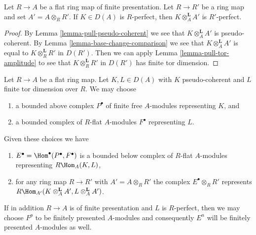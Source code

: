 \begin{lemma}
\label{lemma-base-change-relatively-perfect}
Let $R \to A$ be a flat ring map of finite presentation.
Let $R \to R'$ be a ring map and set $A' = A \otimes_R R'$.
If $K \in D(A)$ is $R$-perfect, then $K \otimes_A^\mathbf{L} A'$ is
$R'$-perfect.
\end{lemma}

\begin{proof}
By Lemma \ref{lemma-pull-pseudo-coherent} we see that
$K \otimes_A^\mathbf{L} A'$ is pseudo-coherent.
By Lemma \ref{lemma-base-change-comparison} we see that
$K \otimes_A^\mathbf{L} A'$ is equal to $K \otimes_R^\mathbf{L} R'$ in $D(R')$.
Then we can apply Lemma \ref{lemma-pull-tor-amplitude}
to see that $K \otimes_R^\mathbf{L} R'$ in $D(R')$ has finite
tor dimension.
\end{proof}

\begin{lemma}
\label{lemma-compute-RHom-relatively-perfect}
Let $R \to A$ be a flat ring map. Let $K, L \in D(A)$ with $K$
pseudo-coherent and $L$ finite tor dimension over $R$. We may choose
\begin{enumerate}
\item a bounded above complex $P^\bullet$
of finite free $A$-modules representing $K$, and
\item a bounded complex of $R$-flat $A$-modules
$F^\bullet$ representing $L$.
\end{enumerate}
Given these choices we have
\begin{enumerate}
\item[(a)] $E^\bullet = \Hom^\bullet(P^\bullet, F^\bullet)$
is a bounded below complex
of $R$-flat $A$-modules representing $R\Hom_A(K, L)$,
\item[(b)] for any ring map $R \to R'$ with $A' = A \otimes_R R'$
the complex $E^\bullet \otimes_R R'$ represents
$R\Hom_{A'}(K \otimes_A^\mathbf{L} A', L \otimes_A^\mathbf{L} A')$.
\end{enumerate}
If in addition $R \to A$ is of finite presentation and $L$ is
$R$-perfect, then we may choose $F^p$ to be finitely presented
$A$-modules and consequently $E^n$ will be finitely presented $A$-modules
as well.
\end{lemma}

